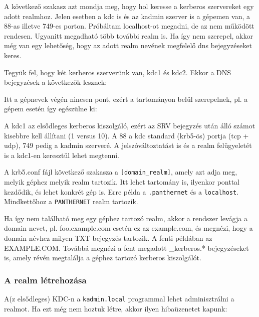 A következő szakasz azt mondja meg, hogy hol keresse a kerberos szervereket egy adott realmhoz. Jelen esetben a kdc is
és az kadmin szerver is a gépemen van, a 88-as illetve 749-es porton. Próbáltam localhost-ot megadni, de az nem
működött rendesen. Ugyanitt megadható több további realm is. Ha így nem szerepel, akkor még van egy lehetőség, hogy az
adott realm nevének megfelelő dns bejegyzéseket keres.

Tegyük fel, hogy két kerberos szerverünk van, kdc1 és kdc2. Ekkor a DNS bejegyzések a következők lesznek:


Itt a gépnevek végén nincsen pont, ezért a tartományon belül szerepelnek, pl. a gépem esetén így egészülne ki:\\

A kdc1 az elsődleges kerberos kiszolgáló, ezért az SRV bejegyzés után álló számot kisebbre kell állítani (1 versus
10). A 88 a kdc standard (krb5-ös) portja (tcp + udp), 749 pedig a kadmin szerveré. A jelszóváltoztatást is és a realm
felügyeletét is a kdc1-en keresztül lehet megtenni.

A krb5.conf fájl következő szakasza a \texttt{[domain\_realm]}, amely azt adja meg, melyik géphez melyik realm
tartozik. Itt lehet tartomány is, ilyenkor ponttal kezdődik, és lehet konkrét gép is. Erre példa a
\texttt{.panthernet} és a \texttt{localhost}. Mindkettőhoz a \texttt{PANTHERNET} realm tartozik.

Ha így nem található meg egy géphez tartozó realm, akkor a rendszer levágja a domain nevet, pl. foo.example.com esetén
ez az example.com, és megnézi, hogy a domain névhez milyen TXT bejegyzés tartozik. A fenti példában az
EXAMPLE.COM. Továbbá megnézi a fent megadott \_kerberos.* bejegyzéseket is, amely révén megtalálja a géphez tartozó
kerberos kiszolgálót.


\subsubsection{A realm létrehozása}
A(z elsődleges) KDC-n a \texttt{kadmin.local} programmal lehet adminisztrálni a realmot. Ha ezt még nem hoztuk létre,
akkor ilyen hibaüzenetet kapunk:

